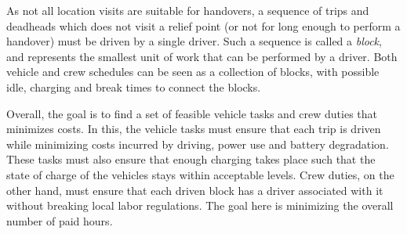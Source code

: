 \documentclass[]{article}
\begin{document}
As not all location visits are suitable for handovers, a sequence of trips and deadheads which does not visit a relief point (or not for long enough to perform a handover) must be driven by a single driver. Such a sequence is called a \emph{block}, and represents the smallest unit of work that can be performed by a driver. Both vehicle and crew schedules can be seen as a collection of blocks, with possible idle, charging and break times to connect the blocks.

Overall, the goal is to find a set of feasible vehicle tasks and crew duties that minimizes costs. In this, the vehicle tasks must ensure that each trip is driven while minimizing costs incurred by driving, power use and battery degradation. These tasks must also ensure that enough charging takes place such that the state of charge of the vehicles stays within acceptable levels. Crew duties, on the other hand, must ensure that each driven block has a driver associated with it without breaking local labor regulations. The goal here is minimizing the overall number of paid hours.
\end{document}
